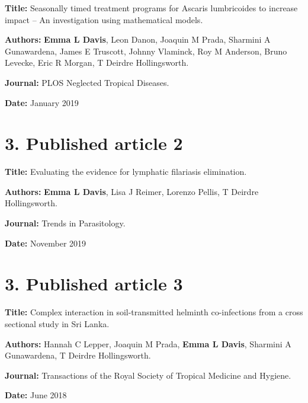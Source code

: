 \textbf{Title:} Seasonally timed treatment programs for Ascaris lumbricoides to increase impact -- An investigation using mathematical models.

\textbf{Authors:} \textbf{Emma L Davis}, Leon Danon, Joaquin M Prada, Sharmini A Gunawardena, James E Truscott, Johnny Vlaminck, Roy M Anderson, Bruno Levecke, Eric R Morgan, T Deirdre Hollingsworth.

\textbf{Journal:} PLOS Neglected Tropical Diseases.

\textbf{Date:} January 2019



\section*{3. Published article 2}

\textbf{Title:} Evaluating the evidence for lymphatic filariasis elimination.

\textbf{Authors:} \textbf{Emma L Davis}, Lisa J Reimer, Lorenzo Pellis, T Deirdre Hollingsworth.

\textbf{Journal:} Trends in Parasitology.

\textbf{Date:} November 2019



\section*{3. Published article 3}

\textbf{Title:} Complex interaction in soil-transmitted helminth co-infections from a cross sectional study in Sri Lanka.

\textbf{Authors:} Hannah C Lepper, Joaquin M Prada, \textbf{Emma L Davis}, Sharmini A Gunawardena, T Deirdre Hollingsworth.

\textbf{Journal:} Transactions of the Royal Society of Tropical Medicine and Hygiene.

\textbf{Date:} June 2018

